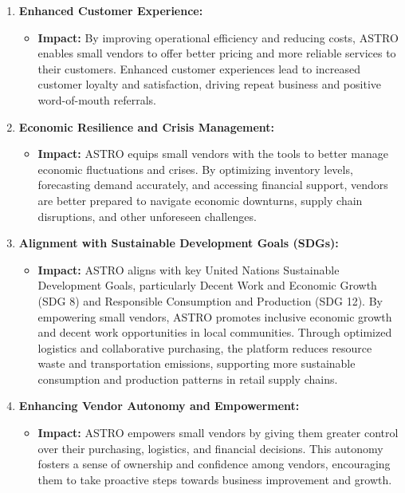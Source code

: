\begin{enumerate}
	\item \textbf{Enhanced Customer Experience:}
	      \begin{itemize}
		      \item \textbf{Impact:} By improving operational efficiency and reducing costs, ASTRO enables small vendors to offer better pricing and more reliable services to their customers. Enhanced customer experiences lead to increased customer loyalty and satisfaction, driving repeat business and positive word-of-mouth referrals.
	      \end{itemize}

	\item \textbf{Economic Resilience and Crisis Management:}
	      \begin{itemize}
		      \item \textbf{Impact:} ASTRO equips small vendors with the tools to better manage economic fluctuations and crises. By optimizing inventory levels, forecasting demand accurately, and accessing financial support, vendors are better prepared to navigate economic downturns, supply chain disruptions, and other unforeseen challenges.
	      \end{itemize}

	\item \textbf{Alignment with Sustainable Development Goals (SDGs):}
	      \begin{itemize}
		      \item \textbf{Impact:} ASTRO aligns with key United Nations Sustainable Development Goals, particularly Decent Work and Economic Growth (SDG 8) and Responsible Consumption and Production (SDG 12). By empowering small vendors, ASTRO promotes inclusive economic growth and decent work opportunities in local communities. Through optimized logistics and collaborative purchasing, the platform reduces resource waste and transportation emissions, supporting more sustainable consumption and production patterns in retail supply chains.
	      \end{itemize}

	\item \textbf{Enhancing Vendor Autonomy and Empowerment:}
	      \begin{itemize}
		      \item \textbf{Impact:} ASTRO empowers small vendors by giving them greater control over their purchasing, logistics, and financial decisions. This autonomy fosters a sense of ownership and confidence among vendors, encouraging them to take proactive steps towards business improvement and growth.
	      \end{itemize}
\end{enumerate}
